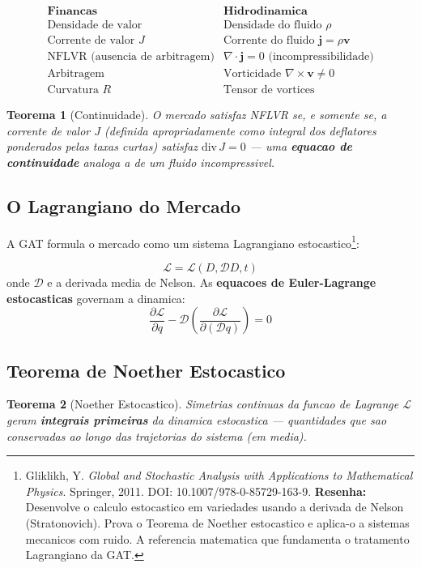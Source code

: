 \documentclass[12pt,a4paper]{article}
\newtheorem{teo}{Teorema}[section]
\theoremstyle{remark}
\begin{document}
\[
\begin{array}{c|c}
\textbf{Financas} & \textbf{Hidrodinamica} \\ \hline
\text{Densidade de valor} & \text{Densidade do fluido } \rho \\
\text{Corrente de valor } J & \text{Corrente do fluido } \mathbf{j} = \rho\mathbf{v} \\
\text{NFLVR (ausencia de arbitragem)} & \nabla \cdot \mathbf{j} = 0 \text{ (incompressibilidade)} \\
\text{Arbitragem} & \text{Vorticidade } \nabla \times \mathbf{v} \neq 0 \\
\text{Curvatura } R & \text{Tensor de vortices}
\end{array}
\]

\begin{teo}[Continuidade]
O mercado satisfaz NFLVR se, e somente se, a corrente de valor $J$ (definida
apropriadamente como integral dos deflatores ponderados pelas taxas curtas)
satisfaz $\text{div}\, J = 0$ — uma \textbf{equacao de continuidade} analoga
a de um fluido incompressivel.
\end{teo}

\subsection{O Lagrangiano do Mercado}

A GAT formula o mercado como um sistema Lagrangiano estocastico\footnote{Gliklikh,
Y. \textit{Global and Stochastic Analysis with Applications to Mathematical
Physics}. Springer, 2011. DOI: 10.1007/978-0-85729-163-9. \textbf{Resenha:}
Desenvolve o calculo estocastico em variedades usando a derivada de Nelson
(Stratonovich). Prova o Teorema de Noether estocastico e aplica-o a sistemas
mecanicos com ruido. A referencia matematica que fundamenta o tratamento
Lagrangiano da GAT.}:

\[
\mathcal{L} = \mathcal{L}(D, \mathcal{D}D, t)
\]
onde $\mathcal{D}$ e a derivada media de Nelson. As \textbf{equacoes de
Euler-Lagrange estocasticas} governam a dinamica:
\[
\frac{\partial\mathcal{L}}{\partial q} - \mathcal{D}\left(
\frac{\partial\mathcal{L}}{\partial(\mathcal{D}q)}\right) = 0
\]

\subsection{Teorema de Noether Estocastico}

\begin{teo}[Noether Estocastico]
Simetrias continuas da funcao de Lagrange $\mathcal{L}$ geram \textbf{integrais
primeiras} da dinamica estocastica — quantidades que sao conservadas ao longo
das trajetorias do sistema (em media).
\end{teo}
\end{document}

